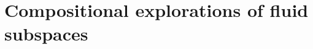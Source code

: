 \chapter[Compositional exploration of fluid subspaces]{Compositional explorations of fluid subspaces}
